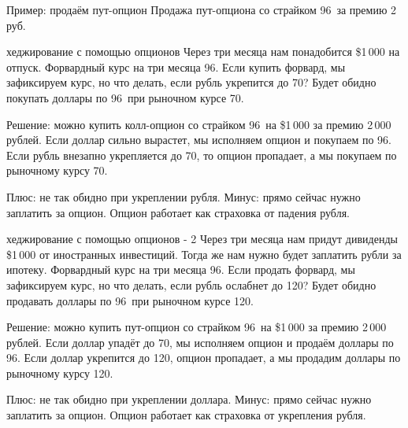 \documentclass{beamer}
\newcommand{\usdrubstrike}{96}
\newcommand{\usdrubaxisspread}{8}
\newcommand{\usdrublow}{70}
\newcommand{\usdrubhigh}{120}
\begin{document}
\begin{frame}{Пример: продаём пут-опцион}
\justifying
Продажа пут-опциона со страйком \usdrubstrike\ за премию 2 руб.

\justifying
\centering
\end{frame}



\begin{frame}{хеджирование с помощью опционов}
\justify
Через три месяца нам понадобится \$1\,000 на отпуск. Форвардный курс на три месяца \usdrubstrike. Если купить форвард, мы зафиксируем курс, но что делать, если рубль укрепится до \usdrublow? Будет обидно покупать доллары по \usdrubstrike\ при рыночном курсе \usdrublow.

\justify
Решение: можно купить колл-опцион со страйком \usdrubstrike\ на \$1\,000 за премию 2\,000 рублей. Если доллар сильно вырастет, мы исполняем опцион и покупаем по \usdrubstrike. Если рубль внезапно укрепляется до \usdrublow, то опцион пропадает, а мы покупаем по рыночному курсу \usdrublow.

\justify
Плюс: не так обидно при укреплении рубля. Минус: прямо сейчас нужно заплатить за опцион. Опцион работает как страховка от падения рубля.
\end{frame}




\begin{frame}{хеджирование с помощью опционов - 2}
\justify
Через три месяца нам придут дивиденды \$1\,000 от иностранных инвестиций. Тогда же нам нужно будет заплатить рубли за ипотеку. Форвардный курс на три месяца \usdrubstrike. Если продать форвард, мы зафиксируем курс, но что делать, если рубль ослабнет до \usdrubhigh? Будет обидно продавать доллары по \usdrubstrike\ при рыночном курсе \usdrubhigh.

\justify
Решение: можно купить пут-опцион со страйком \usdrubstrike\ на \$1\,000 за премию 2\,000 рублей. Если доллар упадёт до \usdrublow, мы исполняем опцион и продаём доллары по \usdrubstrike. Если доллар укрепится до \usdrubhigh, опцион пропадает, а мы продадим доллары по рыночному курсу \usdrubhigh.

\justify
Плюс: не так обидно при укреплении доллара. Минус: прямо сейчас нужно заплатить за опцион. Опцион работает как страховка от укрепления рубля.
\end{frame}
\end{document}
